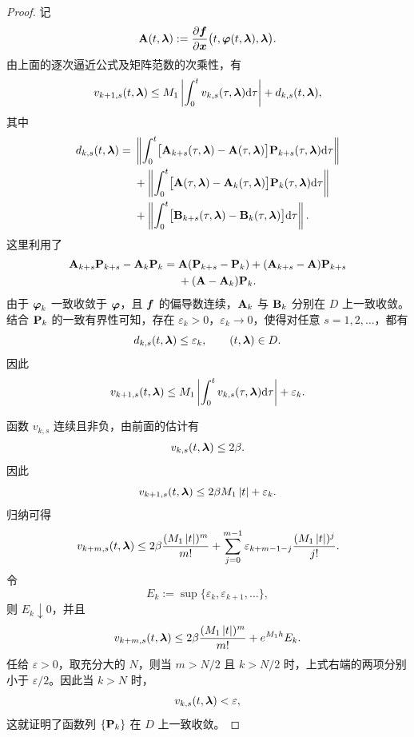 \begin{proof}
	记
	\[
		\mathbf{A}(t,\boldsymbol{\lambda})
		\mathrel{:=}
		\dfrac{\partial\boldsymbol{f}}{\partial\boldsymbol{x}}
		\bigl(t,\boldsymbol{\varphi}(t,\boldsymbol{\lambda}),\boldsymbol{\lambda}\bigr).
	\]
	由上面的逐次逼近公式及矩阵范数的次乘性，有
	\[
		v_{k+1,s}(t,\boldsymbol{\lambda})
		\leq M_1\left| \int_0^t
		v_{k,s}(\tau,\boldsymbol{\lambda})\mathrm{d}\tau \right|
		+d_{k,s}(t,\boldsymbol{\lambda}),
	\]
	其中
	\[
	\begin{aligned}
		d_{k,s}(t,\boldsymbol{\lambda})
		={}&\left\| \int_0^t
		\bigl[\mathbf{A}_{k+s}(\tau,\boldsymbol{\lambda})
		-\mathbf{A}(\tau,\boldsymbol{\lambda})\bigr]
		\mathbf{P}_{k+s}(\tau,\boldsymbol{\lambda})\mathrm{d}\tau \right\|\\
		&+\left\| \int_0^t
		\bigl[\mathbf{A}(\tau,\boldsymbol{\lambda})
		-\mathbf{A}_k(\tau,\boldsymbol{\lambda})\bigr]
		\mathbf{P}_k(\tau,\boldsymbol{\lambda})\mathrm{d}\tau \right\|\\
		&+\left\| \int_0^t
		\bigl[\mathbf{B}_{k+s}(\tau,\boldsymbol{\lambda})
		-\mathbf{B}_k(\tau,\boldsymbol{\lambda})\bigr]\mathrm{d}\tau \right\|.
	\end{aligned}
	\]
	这里利用了
	\[
		\begin{aligned}
		\mathbf{A}_{k+s}\mathbf{P}_{k+s}-\mathbf{A}_k\mathbf{P}_k
		={}&\mathbf{A}(\mathbf{P}_{k+s}-\mathbf{P}_k)
		+(\mathbf{A}_{k+s}-\mathbf{A})\mathbf{P}_{k+s}\\
		&+(\mathbf{A}-\mathbf{A}_k)\mathbf{P}_k.
		\end{aligned}
	\]
	由于 $\boldsymbol{\varphi}_k$ 一致收敛于 $\boldsymbol{\varphi}$，且
	$\boldsymbol{f}$ 的偏导数连续，$\mathbf{A}_k$ 与 $\mathbf{B}_k$ 分别在
	$D$ 上一致收敛。结合 $\mathbf{P}_k$ 的一致有界性可知，存在
	$\varepsilon_k>0$，$\varepsilon_k\to0$，使得对任意
	$s=1,2,\ldots$，都有
	\[
		d_{k,s}(t,\boldsymbol{\lambda})\leq\varepsilon_k,
		\qquad (t,\boldsymbol{\lambda})\in D.
	\]
	因此
	\[
		v_{k+1,s}(t,\boldsymbol{\lambda})
		\leq M_1\left| \int_0^t
		v_{k,s}(\tau,\boldsymbol{\lambda})\mathrm{d}\tau \right|
		+\varepsilon_k.
	\]

	函数 $v_{k,s}$ 连续且非负，由前面的估计有
	\[
		v_{k,s}(t,\boldsymbol{\lambda})\leq2\beta.
	\]
	因此
	\[
		v_{k+1,s}(t,\boldsymbol{\lambda})
		\leq2\beta M_1\left| t \right|+\varepsilon_k.
	\]
	归纳可得
	\[
		v_{k+m,s}(t,\boldsymbol{\lambda})
		\leq
		2\beta\dfrac{(M_1\left| t \right|)^m}{m!}
		+\sum_{j=0}^{m-1}
		\varepsilon_{k+m-1-j}
		\dfrac{(M_1\left| t \right|)^j}{j!}.
	\]
	令
	\[
		E_k\mathrel{:=}\sup\{\varepsilon_k,\varepsilon_{k+1},\ldots\},
	\]
	则 $E_k\downarrow0$，并且
	\[
		v_{k+m,s}(t,\boldsymbol{\lambda})
		\leq
		2\beta\dfrac{(M_1\left| t \right|)^m}{m!}
		+e^{M_1h}E_k.
	\]
	任给 $\varepsilon>0$，取充分大的 $N$，则当
	$m>N/2$ 且 $k>N/2$ 时，上式右端的两项分别小于
	$\varepsilon/2$。因此当 $k>N$ 时，
	\[
		v_{k,s}(t,\boldsymbol{\lambda})<\varepsilon,
	\]
	这就证明了函数列 $\{\mathbf{P}_k\}$ 在 $D$ 上一致收敛。


\end{proof}
